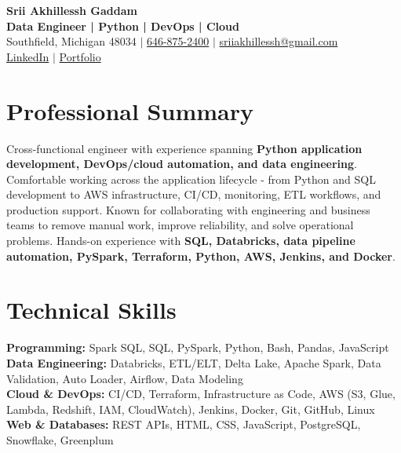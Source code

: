 \documentclass[letterpaper,10pt]{article}
\begin{document}
\fontsize{9.35pt}{10.45pt}\selectfont

\begin{center}
    {\LARGE \textbf{Srii Akhillessh Gaddam}} \\[-1pt]
    \textbf{Data Engineer | Python | DevOps | Cloud} \\[2pt]
    Southfield, Michigan 48034 $|$
    \href{tel:6468752400}{646-875-2400} $|$
    \href{mailto:sriiakhillessh@gmail.com}{sriiakhillessh@gmail.com} \\[1pt]
    \href{https://www.linkedin.com/in/srii-akhiilessh-gaddam-b48668191/}{LinkedIn} $|$
    \href{https://sriiakhillesshg.github.io/portfolio/}{Portfolio}
\end{center}
\vspace{-8pt}

\section{Professional Summary}
\small{Cross-functional engineer with experience spanning \textbf{Python application development, DevOps/cloud automation, and data engineering}. Comfortable working across the application lifecycle - from Python and SQL development to AWS infrastructure, CI/CD, monitoring, ETL workflows, and production support. Known for collaborating with engineering and business teams to remove manual work, improve reliability, and solve operational problems. Hands-on experience with \textbf{SQL, Databricks, data pipeline automation, PySpark, Terraform, Python, AWS, Jenkins, and Docker}.}

\section{Technical Skills}
\small{
\textbf{Programming:} Spark SQL, SQL, PySpark, Python, Bash, Pandas, JavaScript \\
\textbf{Data Engineering:} Databricks, ETL/ELT, Delta Lake, Apache Spark, Data Validation, Auto Loader, Airflow, Data Modeling \\
\textbf{Cloud \& DevOps:} CI/CD, Terraform, Infrastructure as Code, AWS (S3, Glue, Lambda, Redshift, IAM, CloudWatch), Jenkins, Docker, Git, GitHub, Linux \\
\textbf{Web \& Databases:} REST APIs, HTML, CSS, JavaScript, PostgreSQL, Snowflake, Greenplum
}
\end{document}
